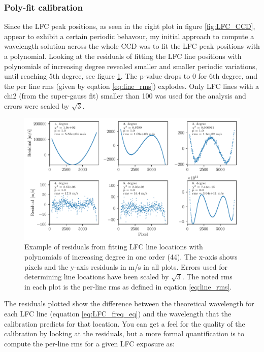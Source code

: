    \subsubsection{Poly-fit calibration}
    Since the LFC peak positions, as seen in the right plot in figure \ref{fig:LFC_CCD}, appear to exhibit a certain periodic behavour, my initial approach to compute a wavelength solution across the whole CCD was to fit the LFC peak positions with a polynomial. Looking at the residuals of fitting the LFC line positions with polynomials of increasing degree revealed smaller and smaller periodic variations, until reaching 5th degree, see figure \ref{fig:LFC_calib_poly_degrees}. The p-value drops to 0 for 6th degree, and the per line rms (given by eqation \ref{eq:line_rms}) explodes. Only LFC lines with a chi2 (from the super-gauss fit) smaller than 100 was used for the analysis and errors were scaled by $\sqrt{3}$.

    \begin{figure}%
        \begin{wide}  
            \includegraphics[width=\textwidth]{figures/calib/calib_poly_fit_degrees_order44_residuals_ang.pdf}
            \caption{Example of residuals from fitting LFC line locations with polynomials of increasing degree in one order (44). The x-axis shows pixels and the y-axis residuals in m/s in all plots. Errors used for determining line locations have been scaled by $\sqrt{3}$. The noted rms in each plot is the per-line rms as defined in eqation \ref{eq:line_rms}.}
            \label{fig:LFC_calib_poly_degrees}
        \end{wide}
    \end{figure}

    The residuals plotted show the difference between the theoretical wavelength for each LFC line (equation \ref{eq:LFC_freq_eq}) and the wavelength that the calibration predicts for that location. You can get a feel for the quality of the calibration by looking at the residuals, but a more formal quantification is to compute the per-line rms for a given LFC exposure as: 
    
